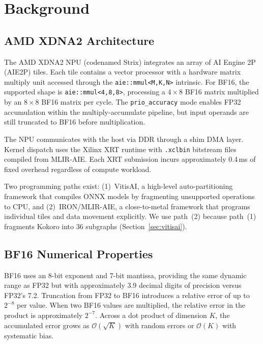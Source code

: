 \documentclass[11pt]{article}
\begin{document}
\section{Background}

\subsection{AMD XDNA2 Architecture}

The AMD XDNA2 NPU (codenamed Strix) integrates an array of AI Engine 2P (AIE2P) tiles. Each tile contains a vector processor with a hardware matrix multiply unit accessed through the \texttt{aie::mmul<M,K,N>} intrinsic. For BF16, the supported shape is \texttt{aie::mmul<4,8,8>}, processing a $4\times8$ BF16 matrix multiplied by an $8\times8$ BF16 matrix per cycle. The \texttt{prio\_accuracy} mode enables FP32 accumulation within the multiply-accumulate pipeline, but input operands are still truncated to BF16 before multiplication.

The NPU communicates with the host via DDR through a shim DMA layer. Kernel dispatch uses the Xilinx XRT runtime with \texttt{.xclbin} bitstream files compiled from MLIR-AIE. Each XRT submission incurs approximately 0.4\,ms of fixed overhead regardless of compute workload.

Two programming paths exist: (1)~VitisAI, a high-level auto-partitioning framework that compiles ONNX models by fragmenting unsupported operations to CPU, and (2)~IRON/MLIR-AIE, a close-to-metal framework that programs individual tiles and data movement explicitly. We use path~(2) because path~(1) fragments Kokoro into 36 subgraphs (Section~\ref{sec:vitisai}).

\subsection{BF16 Numerical Properties}

BF16 uses an 8-bit exponent and 7-bit mantissa, providing the same dynamic range as FP32 but with approximately 3.9 decimal digits of precision versus FP32's 7.2. Truncation from FP32 to BF16 introduces a relative error of up to $2^{-8}$ per value. When two BF16 values are multiplied, the relative error in the product is approximately $2^{-7}$. Across a dot product of dimension $K$, the accumulated error grows as $\mathcal{O}(\sqrt{K})$ with random errors or $\mathcal{O}(K)$ with systematic bias.
\end{document}
